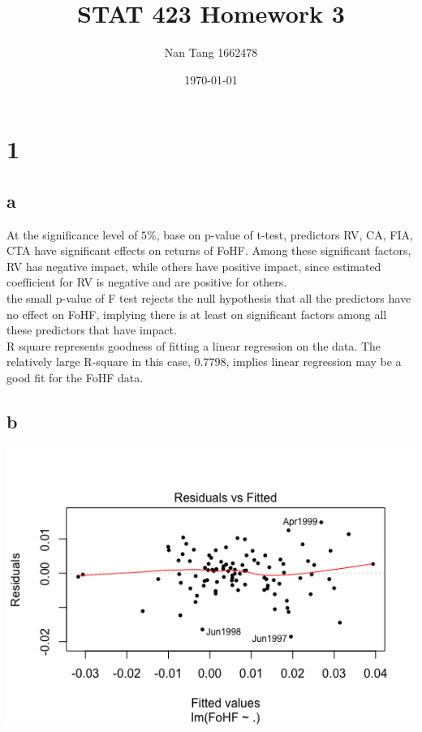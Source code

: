 \documentclass[11pt,letterpaper]{article}
\title{STAT 423 Homework 3}
\author{Nan Tang 1662478}
\date{\today}
\begin{document}
\maketitle
\section*{1}
\subsection*{a}

\noindent At the significance level of $5 \%$, base on p-value of t-test, predictors RV, CA, FIA, CTA have significant effects on returns of FoHF. Among these significant factors, RV has negative impact, while others have positive impact, since estimated coefficient for RV is negative and are positive for others. \\

\noindent the small p-value of F test rejects the null hypothesis that all the predictors have no effect on FoHF, implying there is at least on significant factors among all these predictors that have impact. \\

\noindent R square represents goodness of fitting a linear regression on the data. The relatively large R-square in this case, $0.7798$, implies linear regression may be a good fit for the FoHF data. 

\subsection*{b}
\includegraphics[scale=0.7]{1-b-1.png}
\end{document}
